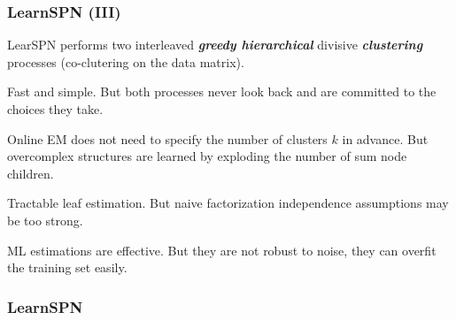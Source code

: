 \documentclass[xcolor={usenames,dvipsnames,svgnames}, compress]{beamer}
\begin{document}
\begin{frame}
  \frametitle{LearnSPN (III)}
  \footnotesize
  
  \textsf{LearSPN} performs two interleaved \textbf{\emph{greedy
      hierarchical}} divisive \textbf{\emph{clustering}}
  processes (co-clutering on the data matrix).\par\bigskip

  Fast and simple. But both processes never look back and are
  committed to the choices they take.\par\bigskip

  Online EM does not need to specify the number of clusters $k$ in
  advance. But overcomplex structures are learned by exploding the number of sum
  node children.\par\bigskip

  Tractable leaf estimation. But naive factorization independence
  assumptions may be too strong.\par\bigskip

  ML estimations are effective. But they are not robust to noise, they can overfit the training set easily.
\end{frame}

\begin{frame}
  \frametitle{LearnSPN}
\end{frame}
\end{document}
